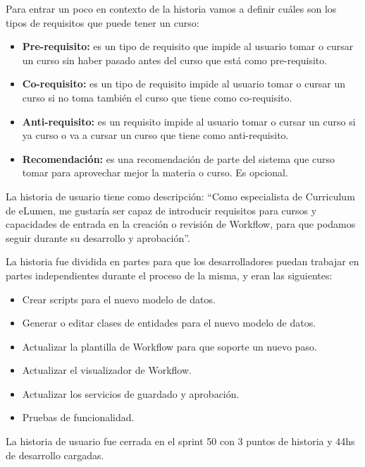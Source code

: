 Para entrar un poco en contexto de la historia vamos a definir cuáles son los tipos de requisitos que puede tener un curso:

\begin{itemize}
	\item \textbf{Pre-requisito:} es un tipo de requisito que impide al usuario tomar o cursar un curso sin haber pasado antes del curso que está como pre-requisito.
	\item \textbf{Co-requisito:} es un tipo de requisito impide al usuario tomar o cursar un curso si no toma también el curso que tiene como co-requisito.
	\item \textbf{Anti-requisito:} es un requisito impide al usuario tomar o cursar un curso si ya curso o va a cursar un curso que tiene como anti-requisito.
	\item \textbf{Recomendación:} es una recomendación de parte del sistema que curso tomar para aprovechar mejor la materia o curso. Es opcional.
\end{itemize}

La historia de usuario tiene como descripción: “Como especialista de Curriculum de eLumen, me gustaría ser capaz de introducir requisitos para cursos y capacidades de entrada en la creación o revisión de Workflow, para que podamos seguir durante su desarrollo y aprobación”.

La historia fue dividida en partes para que los desarrolladores puedan trabajar en partes independientes durante el proceso de la misma, y eran las siguientes:
\begin{itemize}
	\item Crear scripts para el nuevo modelo de datos.
	\item Generar o editar clases de entidades para el nuevo modelo de datos.
	\item Actualizar la plantilla de Workflow para que soporte un nuevo paso.
	\item Actualizar el visualizador de Workflow.
	\item Actualizar los servicios de guardado y aprobación.
	\item Pruebas de funcionalidad.
\end{itemize}

La historia de usuario fue cerrada en el sprint 50 con 3 puntos de historia y 44hs de desarrollo cargadas.

